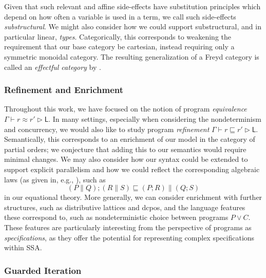 \documentclass[acmsmall,screen,review]{acmart}
\newcommand{\ms}[1]{\ensuremath{\mathsf{#1}}}
\newcommand{\haslb}[3]{#1 \vdash #2 \rhd #3}
\newcommand{\teqv}{\approx}
\newcommand{\lbeq}[4]{#1 \vdash #2 \teqv #3 \rhd {#4}}
\begin{document}
Given that such relevant and affine side-effects have substitution principles which depend on how
often a variable is used in a term, we call such side-effects \emph{substructural}. We might also
consider how we could support substructural, and in particular linear, \emph{types}. Categorically,
this corresponds to weakening the requirement that our base category be cartesian, instead requiring
only a symmetric monoidal category. The resulting generalization of a Freyd category is called an
\emph{effectful category} by \citet{promonad}.

\subsubsection{Refinement and Enrichment}

Throughout this work, we have focused on the notion of program \emph{equivalence}
$\lbeq{\Gamma}{r}{r'}{\ms{L}}$. In many settings, especially when considering the nondeterminism and
concurrency, we would also like to study program \emph{refinement} $\haslb{\Gamma}{r \sqsubseteq
r'}{\ms{L}}$. Semantically, this corresponds to an enrichment of our model in the category of
partial orders; we conjecture that adding this to our semantics would require minimal changes. We
may also consider how our syntax could be extended to support explicit parallelism and how we could
reflect the corresponding algebraic laws (as given in, e.g., \citet{hoare-parallel-14}), such as
\begin{equation}
  (P \parallel Q) ; (R \parallel S) \sqsubseteq (P ; R) \parallel (Q ; S)
\end{equation}
in our equational theory. More generally, we can consider enrichment with further structures, such
as distributive lattices and dcpos, and the language features these correspond to, such as
nondeterministic choice between programs $P \lor C$. These features are particularly interesting
from the perspective of programs as \emph{specifications}, as they offer the potential for
representing complex specifications within SSA.

\subsubsection{Guarded Iteration}
\end{document}
